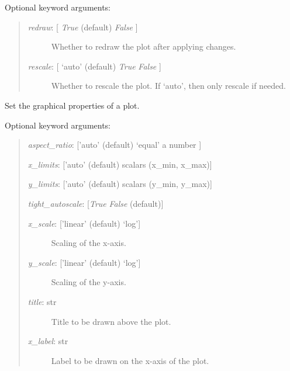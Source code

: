 \documentclass[letterpaper,10pt,english]{sphinxmanual}
\begin{document}
\begin{fulllineitems}
\begin{fulllineitems}
\begin{quote}
\begin{description}
\end{description}
\end{quote}

Optional keyword arguments:
\begin{quote}
\begin{description}
\item[{\emph{redraw}: {[} \emph{True}  (default) \textbar{} \emph{False} {]}}] \leavevmode
Whether to redraw the plot after applying changes.

\item[{\emph{rescale}: {[} `auto' (default) \textbar{} \emph{True} \textbar{} \emph{False} {]}}] \leavevmode
Whether to rescale the plot. If `auto', then only rescale if needed.

\end{description}
\end{quote}

\end{fulllineitems}


\begin{fulllineitems}
\label{api:controls.Plot2D.set_plot_properties}
Set the graphical properties of a plot.

Optional keyword arguments:
\begin{quote}

\emph{aspect\_ratio}: {[}'auto' (default) \textbar{} `equal' \textbar{} a number {]}

\emph{x\_limits}: {[}'auto' (default) \textbar{} scalars (x\_min, x\_max){]}

\emph{y\_limits}: {[}'auto' (default) \textbar{} scalars (y\_min, y\_max){]}

\emph{tight\_autoscale}: {[}\emph{True} \textbar{} \emph{False} (default){]}
\begin{description}
\item[{\emph{x\_scale}: {[}'linear' (default) \textbar{} `log'{]}}] \leavevmode
Scaling of the x-axis.

\item[{\emph{y\_scale}: {[}'linear' (default) \textbar{} `log'{]}}] \leavevmode
Scaling of the y-axis.

\item[{\emph{title}: str}] \leavevmode
Title to be drawn above the plot.

\item[{\emph{x\_label}: str}] \leavevmode
Label to be drawn on the x-axis of the plot.


\end{description}
\end{quote}
\end{fulllineitems}
\end{fulllineitems}
\end{document}
